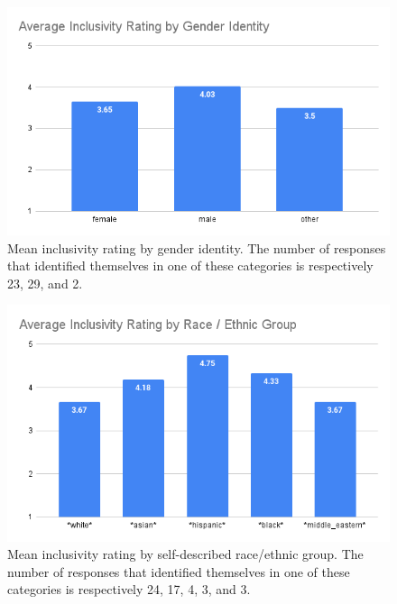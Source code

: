 \documentclass{article}
\begin{document}
\begin{figure}[h]
\label{gender}
\includegraphics[width=\textwidth]{gender_identity.png}
\caption{Mean inclusivity rating by gender identity.
The number of responses that identified themselves in 
one of these categories is respectively 23, 29, and 2.}
\end{figure}
\begin{figure}[h]
\label{race}
\includegraphics[width=\textwidth]{race_ethnic_group.png}
\caption{Mean inclusivity rating by self-described race/ethnic group.
The number of responses that identified themselves in 
one of these categories is respectively 24, 17, 4, 3, and 3.}
\end{figure}
\end{document}
